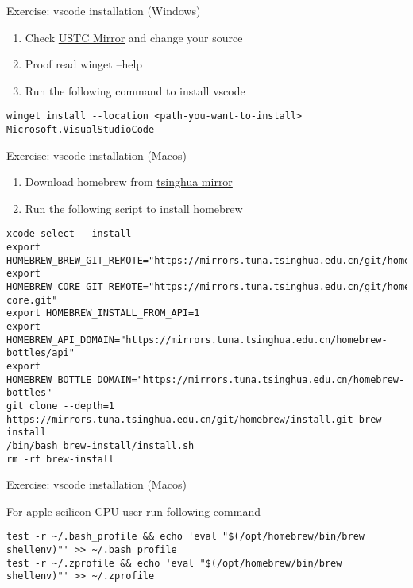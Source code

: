 \begin{frame}[fragile]{Exercise: vscode installation (Windows)}
	\begin{enumerate}
		\item Check \href{https://mirrors.ustc.edu.cn/help/winget-source.html}{USTC Mirror} and change your source
		\item Proof read winget --help
		\item Run the following command to install vscode
	\end{enumerate}
	\begin{verbatim}
winget install --location <path-you-want-to-install> Microsoft.VisualStudioCode
	\end{verbatim}
		
\end{frame}

\begin{frame}[fragile]{Exercise: vscode installation (Macos)}
	\begin{enumerate}
		\item Download homebrew from \href{https://mirrors.tuna.tsinghua.edu.cn/help/homebrew/}{tsinghua mirror}
		\item Run the following script to install homebrew
	\end{enumerate}
	\begin{verbatim}
xcode-select --install
export HOMEBREW_BREW_GIT_REMOTE="https://mirrors.tuna.tsinghua.edu.cn/git/homebrew/brew.git"
export HOMEBREW_CORE_GIT_REMOTE="https://mirrors.tuna.tsinghua.edu.cn/git/homebrew/homebrew-core.git"
export HOMEBREW_INSTALL_FROM_API=1
export HOMEBREW_API_DOMAIN="https://mirrors.tuna.tsinghua.edu.cn/homebrew-bottles/api"
export HOMEBREW_BOTTLE_DOMAIN="https://mirrors.tuna.tsinghua.edu.cn/homebrew-bottles"
git clone --depth=1 https://mirrors.tuna.tsinghua.edu.cn/git/homebrew/install.git brew-install
/bin/bash brew-install/install.sh
rm -rf brew-install
	\end{verbatim}
\end{frame}

\begin{frame}[fragile]{Exercise: vscode installation (Macos)}

	For apple scilicon CPU user run following command

	\begin{verbatim}
test -r ~/.bash_profile && echo 'eval "$(/opt/homebrew/bin/brew shellenv)"' >> ~/.bash_profile
test -r ~/.zprofile && echo 'eval "$(/opt/homebrew/bin/brew shellenv)"' >> ~/.zprofile
	\end{verbatim}

\end{frame}

